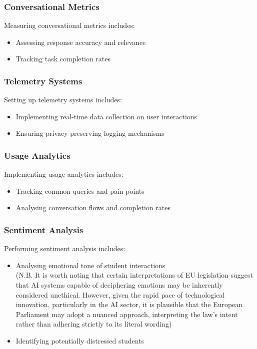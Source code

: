 \documentclass[14pt,a4paper]{article}
\begin{document}
\begin{multicols}{2}

\subsubsection{Conversational Metrics}
Measuring conversational metrics \textit{\parencite[pp. 1-32]{Quarteroni2024}} includes:
\begin{itemize}
    \item Assessing response accuracy and relevance
    \item Tracking task completion rates
\end{itemize}

\subsubsection*{Telemetry Systems}
Setting up telemetry systems \textit{\parencite[pp. 30-60]{Vadapalli2023}} includes:
\begin{itemize}
    \item Implementing real-time data collection on user interactions
    \item Ensuring privacy-preserving logging mechanisms
\end{itemize}



\subsubsection{Usage Analytics}
Implementing usage analytics \textit{\parencite[pp. 50-100]{Beasley2023}} includes:
\begin{itemize}
    \item Tracking common queries and pain points
    \item Analysing conversation flows and completion rates
\end{itemize}


\subsubsection*{Sentiment Analysis}
Performing sentiment analysis \textit{\parencite[pp. 50-100]{Liu2023}} includes:
\begin{itemize}
    \item Analysing emotional tone of student interactions\\ (N.B. It is worth noting that certain interpretations of EU legislation suggest that AI systems capable of deciphering emotions may be inherently considered unethical. However, given the rapid pace of technological innovation, particularly in the AI sector, it is plausible that the European Parliament may adopt a nuanced approach, interpreting the law's intent rather than adhering strictly to its literal wording) \textit{\parencite[pp. 150-175]{Dignum2023}}
    \item Identifying potentially distressed students
\end{itemize}


\end{multicols}
\end{document}
